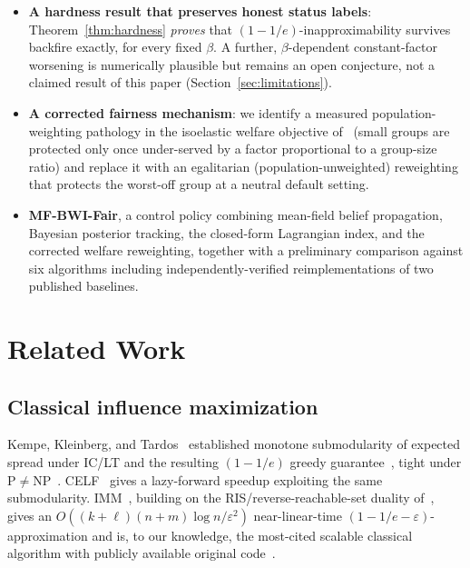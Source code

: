 \documentclass[journal]{IEEEtran}
\begin{document}
\begin{itemize}
  resulting 2-state/3-action per-node control problem, reducing the
  per-round decision from bisection with per-node value iteration to
  $O(Km+n\log n)$ -- an approximately $130\times$ speedup measured in this
  project's implementation.
\item \textbf{A hardness result that preserves honest status labels}:
  Theorem~\ref{thm:hardness} \emph{proves} that $(1-1/e)$-inapproximability
  survives backfire exactly, for every fixed $\beta$. A further,
  $\beta$-dependent constant-factor worsening is numerically plausible but
  remains an open conjecture, not a claimed result of this paper
  (Section~\ref{sec:limitations}).
\item \textbf{A corrected fairness mechanism}: we identify a measured
  population-weighting pathology in the isoelastic welfare objective
  of~\cite{rahmattalabi2021fair} (small groups are protected only once
  under-served by a factor proportional to a group-size ratio) and replace
  it with an egalitarian (population-unweighted) reweighting that protects
  the worst-off group at a neutral default setting.
\item \textbf{MF-BWI-Fair}, a control policy combining mean-field belief
  propagation, Bayesian posterior tracking, the closed-form Lagrangian
  index, and the corrected welfare reweighting, together with a preliminary
  comparison against six algorithms including independently-verified
  reimplementations of two published baselines.
\end{itemize}

\section{Related Work}
\label{sec:related}

\subsection{Classical influence maximization}
Kempe, Kleinberg, and Tardos~\cite{kempe2003maximizing} established
monotone submodularity of expected spread under IC/LT and the resulting
$(1-1/e)$ greedy guarantee~\cite{nemhauser1978analysis}, tight under
$\mathrm{P}\ne\mathrm{NP}$~\cite{feige1998threshold}. CELF~\cite{leskovec2007cost}
gives a lazy-forward speedup exploiting the same submodularity. IMM~\cite{tang2015influence},
building on the RIS/reverse-reachable-set duality of~\cite{borgs2014maximizing},
gives an $O((k+\ell)(n+m)\log n/\varepsilon^2)$ near-linear-time
$(1-1/e-\varepsilon)$-approximation and is, to our knowledge, the most-cited
scalable classical algorithm with publicly available original
code~\cite{chen2018issue}.
\end{document}
